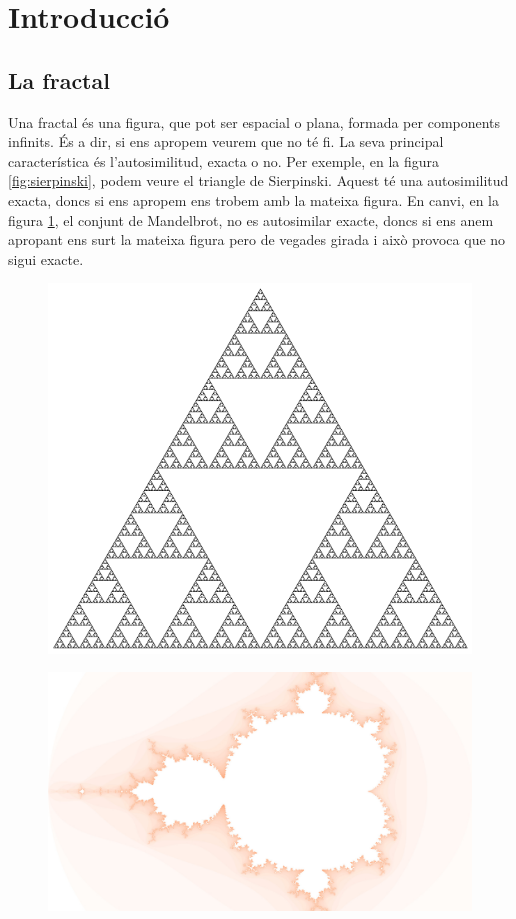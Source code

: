 \section{Introducció}

\subsection{La fractal}
Una fractal és una figura, que pot ser espacial o plana, formada per components infinits. És a dir, si ens apropem veurem que no té fi. La seva principal característica és l'autosimilitud, exacta o no. Per exemple, en la figura \ref{fig:sierpinski}, podem veure el triangle de Sierpinski. Aquest té una autosimilitud exacta, doncs si ens apropem ens trobem amb la mateixa figura. En canvi, en la figura \ref{fig:mandelbrot}, el conjunt de Mandelbrot, no es autosimilar exacte, doncs si ens anem apropant ens surt la mateixa figura pero de vegades girada i això provoca que no sigui exacte.

\begin{figure}[h]
    \centering
    \begin{minipage}{.5\textwidth}
      \centering
      \includegraphics[width=.8\linewidth]{imatges/sierpinski.jpg}
      \label{fig:sierpinski}
    \end{minipage}%
    \begin{minipage}{.5\textwidth}
      \centering
      \includegraphics[width=.8\linewidth]{imatges/Captured_On_Mon_Dec__6_18-48-29_2021-.jpg}
      \label{fig:mandelbrot}
    \end{minipage}
\end{figure}


